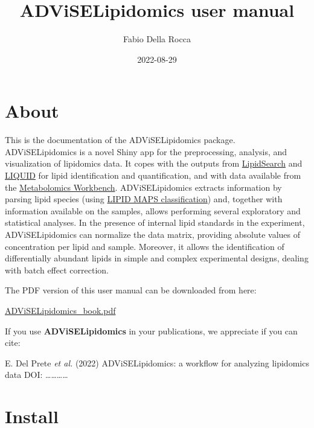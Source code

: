 \documentclass[
]{book}
\title{ADViSELipidomics user manual}
\author{Fabio Della Rocca}
\date{2022-08-29}
\begin{document}
\maketitle

{
\setcounter{tocdepth}{1}
\tableofcontents
}
\hypertarget{about}{%
\chapter{About}\label{about}}

This is the documentation of the ADViSELipidomics package. ADViSELipidomics is a novel Shiny app for the preprocessing, analysis, and visualization of lipidomics data. It copes with the outputs from \href{https://www.thermofisher.com/it/en/home/industrial/mass-spectrometry/liquid-chromatography-mass-spectrometry-lc-ms/lc-ms-software/multi-omics-data-analysis/lipid-search-software.html}{LipidSearch} and \href{https://github.com/PNNL-Comp-Mass-Spec/LIQUID}{LIQUID} for lipid identification and quantification, and with data available from the \href{https://www.metabolomicsworkbench.org/}{Metabolomics Workbench}. ADViSELipidomics extracts information by parsing lipid species (using \href{https://www.lipidmaps.org/data/classification/lipid_cns.html}{LIPID MAPS classification}) and, together with information available on the samples, allows performing several exploratory and statistical analyses. In the presence of internal lipid standards in the experiment, ADViSELipidomics can normalize the data matrix, providing absolute values of concentration per lipid and sample. Moreover, it allows the identification of differentially abundant lipids in simple and complex experimental designs, dealing with batch effect correction.

The PDF version of this user manual can be downloaded from here:

\href{https://github.com/ShinyFabio/ADViSELipidomics_book/raw/main/docs/ADViSELipidomics_book.pdf}{ADViSELipidomics\_book.pdf}

If you use \textbf{ADViSELipidomics} in your publications, we appreciate if you can cite:

E. Del Prete \emph{et al.} (2022) ADViSELipidomics: a workflow for analyzing lipidomics data DOI: \ldots\ldots\ldots\ldots{}

\hypertarget{install}{%
\chapter{Install}\label{install}}
\end{document}
